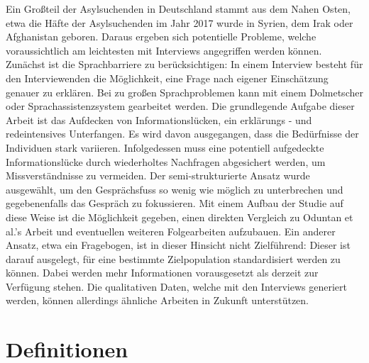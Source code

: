 \documentclass[12pt,oneside]{article}
\begin{document}
Ein Gro\ss{}teil der Asylsuchenden in Deutschland stammt aus dem Nahen Osten, etwa die H\"afte der Asylsuchenden im Jahr 2017 wurde in Syrien, dem Irak oder Afghanistan geboren\cite{asylum2017seekers}. Daraus ergeben sich potentielle Probleme, welche voraussichtlich am leichtesten mit Interviews angegriffen werden k\"onnen.
Zun\"achst ist die Sprachbarriere zu ber\"ucksichtigen: In einem Interview besteht f\"ur den Interviewenden die M\"oglichkeit, eine Frage nach eigener Einsch\"atzung genauer zu erkl\"aren. Bei zu gro\ss{}en Sprachproblemen kann mit einem Dolmetscher oder Sprachassistenzsystem gearbeitet werden.\newline
Die grundlegende Aufgabe dieser Arbeit ist das Aufdecken von Informationsl\"ucken, ein erkl\"arungs - und redeintensives Unterfangen. Es wird davon ausgegangen, dass die Bed\"urfnisse der Individuen stark variieren. Infolgedessen muss eine potentiell aufgedeckte Informationsl\"ucke durch wiederholtes Nachfragen abgesichert werden, um Missverst\"andnisse zu vermeiden.\newline
Der semi-strukturierte Ansatz wurde ausgew\"ahlt, um den Gespr\"achsfuss so wenig wie m\"oglich zu unterbrechen und gegebenenfalls das Gespr\"ach zu fokussieren.\newline
Mit einem Aufbau der Studie auf diese Weise ist die M\"oglichkeit gegeben, einen direkten Vergleich zu Oduntan et al.'s Arbeit und eventuellen weiteren Folgearbeiten aufzubauen.\newline
Ein anderer Ansatz, etwa ein Fragebogen, ist in dieser Hinsicht nicht Zielf\"uhrend: Dieser ist darauf ausgelegt, f\"ur eine bestimmte Zielpopulation standardisiert werden zu k\"onnen. Dabei werden mehr Informationen vorausgesetzt als derzeit zur Verf\"ugung stehen.\newline
Die qualitativen Daten, welche mit den Interviews generiert werden, k\"onnen allerdings \"ahnliche Arbeiten in Zukunft unterst\"utzen.\newline

\section{Definitionen}
\end{document}
